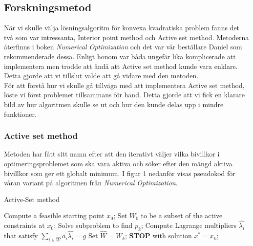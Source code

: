 \subsection{Forskningsmetod}
När vi skulle välja lösningsalgoritm för konvexa kvadratiska problem fanns det två som var intressanta, Interior point method och Active set method. Metoderna återfinns i boken \emph{Numerical Optimization} och det var vår beställare Daniel som rekommenderade dessa. Enligt honom var båda ungefär lika komplicerade att implementera men trodde att ändå att Active set method kunde vara enklare. Detta gjorde att vi tillslut valde att gå vidare med den metoden. 
\\
För att förstå hur vi skulle gå tillväga med att implementera Active set method, löste vi först problemet tillsammans för hand. Detta gjorde att vi fick en klarare bild av hur algoritmen skulle se ut och hur den kunde delas upp i mindre funktioner.     

\subsubsection{Active set method}   
Metoden har fått sitt namn efter att den iterativt väljer vilka bivillkor i optimeringsproblemet som ska vara aktiva och söker efter den mängd aktiva bivillkor som ger ett globalt minimum. I figur 1 nedanför visas pseudokod för våran variant på algoritmen från \emph{Numerical Optimization}.

\begin{algorithm}
\caption{Active-Set method}
\begin{algorithmic}
\State Compute a feasible starting point $x_0$;
\State Set $W_0$ to be a subset of the active constraints at $x_0$;
	\State Solve subproblem to find $p_k$;
		\State Compute Lagrange multipliers $\hat{\lambda_i}$ that satisfy $\sum\limits_{i \in \hat{W}}$$a_i\hat{\lambda_i}=g$
		\State Set $\hat{W}=W_k$;
		\State \textbf{STOP} with solution $x^* = x_k$;
		\Else
		\EndIf
	\EndIf
	
\EndFor
	
	
\EndProcedure
\end{algorithmic}
\end{algorithm}